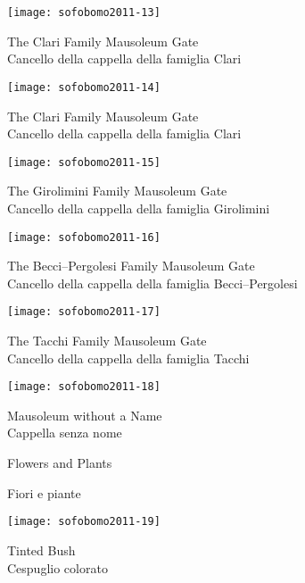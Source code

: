 \begin{center}
\texttt{[image: sofobomo2011-13]}

{The Clari Family Mausoleum Gate}\\
{\footnotesize Cancello della cappella della famiglia Clari}
\vspace*{\fill}
\newpage

\texttt{[image: sofobomo2011-14]}

{The Clari Family Mausoleum Gate}\\
{\footnotesize Cancello della cappella della famiglia Clari}
\vspace*{\fill}
\newpage

\texttt{[image: sofobomo2011-15]}

{The Girolimini Family Mausoleum Gate}\\
{\footnotesize Cancello della cappella della famiglia Girolimini}
\vspace*{\fill}
\newpage

\texttt{[image: sofobomo2011-16]}

{The Becci--Pergolesi Family Mausoleum Gate}\\
{\footnotesize Cancello della cappella della famiglia Becci--Pergolesi}
\vspace*{\fill}
\newpage

\texttt{[image: sofobomo2011-17]}

{The Tacchi Family Mausoleum Gate}\\
{\footnotesize Cancello della cappella della famiglia Tacchi}
\vspace*{\fill}
\newpage

\texttt{[image: sofobomo2011-18]}

{Mausoleum without a Name}\\
{\footnotesize Cappella senza nome}
\vspace*{\fill}
\newpage

\pagestyle{empty}
\vspace*{2in}

\hfill{\textsf{\Huge Flowers and Plants}}

\hfill{\textsf{\LARGE Fiori e piante}}

\clearpage{\pagestyle{empty}\cleardoublepage}

\pagestyle{plain}

\texttt{[image: sofobomo2011-19]}

{Tinted Bush}\\
{\footnotesize Cespuglio colorato}
\vspace*{\fill}
\newpage


\end{center}
